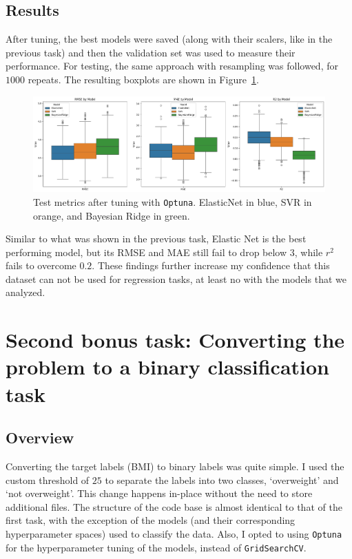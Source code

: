\documentclass[12pt]{article}
\begin{document}
\subsection{Results}
After tuning, the best models were saved (along with their scalers, like in the
previous task) and then the validation set was used to measure their performance.
For testing, the same approach with resampling was followed, for $1000$ repeats.
The resulting boxplots are shown in Figure~\ref{fig:optuna}.

\begin{figure}[H]
    \centering
    \includegraphics[width=\textwidth]{ims/optuna.png}
    \caption{Test metrics after tuning with \texttt{Optuna}. ElasticNet in blue,
    SVR in orange, and Bayesian Ridge in green.}
    \label{fig:optuna}
\end{figure}

Similar to what was shown in the previous task, Elastic Net is the best performing
model, but its RMSE and MAE still fail to drop below $3$, while $r^2$ fails to
overcome $0.2$. These findings further increase my confidence that this dataset
can not be used for regression tasks, at least no with the models that we analyzed.


\clearpage
\section{Second bonus task: Converting the problem to a binary classification task}


\subsection{Overview}

Converting the target labels (BMI) to binary labels was quite simple. I used the
custom threshold of $25$ to separate the labels into two classes, `overweight'
and `not overweight'. This change happens in-place without the need to store
additional files. The structure of the code base is almost identical to that of the
first task, with the exception of the models (and their corresponding hyperparameter
spaces) used to classify the data. Also, I opted to using \texttt{Optuna} for the
hyperparameter tuning of the models, instead of \texttt{GridSearchCV}.
\end{document}
